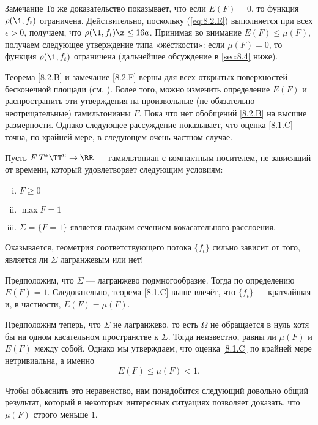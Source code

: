 \begin{thm}{Замечание}\label{8.2.F}
То же доказательство показывает, что если $E (F) = 0$, то функция
$\rho (\1, f_t)$ ограничена. 
Действительно, поскольку (\ref{eq:8.2.E}) выполняется при всех
$\epsilon> 0$, получаем, что $\rho (\1, f_t) \z\le 16a$. 
Принимая во внимание $E (F) \le \mu (F)$, получаем следующее
утверждение типа «жёсткости»: если $\mu (F) = 0$, то функция $\rho
(\1, f_t)$ ограничена (дальнейшее обсуждение в \ref{sec:8.4} ниже). 
\end{thm}

Теорема \ref{8.2.B} и замечание \ref{8.2.F} верны для всех открытых
поверхностей бесконечной площади (см. \cite{PS}). 
Более того, можно изменить определение $E (F)$ и распространить эти
утверждения на произвольные (не обязательно неотрицательные)
гамильтонианы $F$. 
Пока что нет обобщений \ref{8.2.B} на высшие размерности.
Однако следующее рассуждение показывает, что оценка \ref{8.1.C} точна,
по крайней мере, в следующем очень частном случае. 

Пусть $F\: T^\ast \TT^n \to \RR$ --- гамильтониан с компактным носителем, не зависящий от времени, который удовлетворяет следующим условиям: 
\begin{enumerate}[(i)]
\item $F \ge 0 $
\item $\max F = 1$ 
\item {} $\Sigma =
  \{F = 1\}$ является гладким сечением кокасательного расслоения. 
\end{enumerate}

Оказывается, геометрия соответствующего потока $\{f_t\}$ сильно
зависит от того, является ли $\Sigma$ лагранжевым или нет! 

Предположим, что $\Sigma$ --- лагранжево подмногообразие.
Тогда по определению $E (F) = 1$.
Следовательно, теорема \ref{8.1.C} выше влечёт, что $\{f_t\}$ ---
кратчайшая и, в частности, $E (F) = \mu (F)$. 

Предположим теперь, что $\Sigma$ не лагранжево, то есть $\Omega$ не
обращается в нуль хотя бы на одном касательном пространстве к
$\Sigma$. 
Тогда неизвестно, равны ли $\mu (F)$ и $E (F)$ между собой.
Однако мы утверждаем, что оценка \ref{8.1.C} по крайней мере
нетривиальна, а именно  
\begin{equation}
E (F) \le \mu (F) <1.\label{8.2.G}
\end{equation}

Чтобы объяснить это неравенство, нам понадобится следующий довольно
общий результат, который в некоторых интересных ситуациях позволяет
доказать, что $\mu (F)$ строго меньше $1$. 


